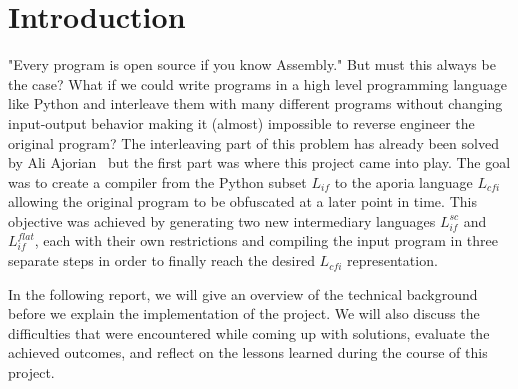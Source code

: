 \section{Introduction}

"Every program is open source if you know Assembly." But must this always be the case? What if we could write programs in a high level programming language like Python and
interleave them with many different programs without changing input-output behavior making it (almost) impossible to reverse engineer the original program? The interleaving part of this problem has already been 
solved by Ali Ajorian~\cite{ajorian2024aporia} but the first part was where this project came into play.
The goal was to create a compiler from the Python subset $L_{if}$ to the aporia language $L_{cfi}$ allowing the original program to be obfuscated at a later point in time.
This objective was achieved by generating two new intermediary languages $L_{if}^{sc}$ and $L_{if}^{flat}$, each with their own restrictions and compiling the input program 
in three separate steps in order to finally reach the desired $L_{cfi}$ representation.

In the following report, we will give an overview of the technical background before we explain the implementation of the project. We will also discuss the difficulties that were 
encountered while coming up with solutions, evaluate the achieved outcomes, and reflect on the lessons learned during the course of this project.
